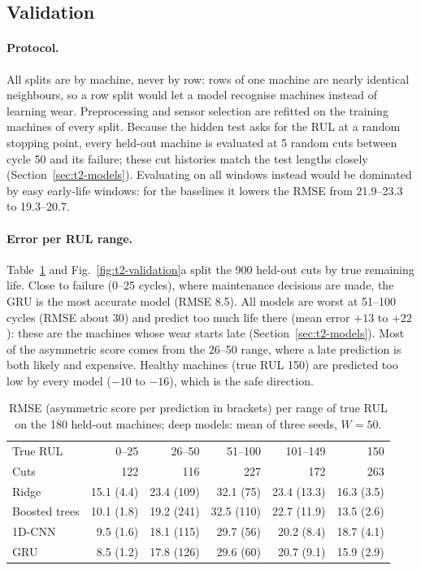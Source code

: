 \subsection{Validation}
\label{sec:t2-validation}

\paragraph{Protocol.} All splits are by machine, never by row: rows of one machine are nearly
identical neighbours, so a row split would let a model recognise machines instead of learning
wear. Preprocessing and sensor selection are refitted on the training machines of every split.
Because the hidden test asks for the RUL at a random stopping point, every held-out machine is
evaluated at 5 random cuts between cycle 50 and its failure; these cut histories match the test
lengths closely (Section~\ref{sec:t2-models}). Evaluating on all windows instead would be
dominated by easy early-life windows: for the baselines it lowers the RMSE from 21.9--23.3 to
19.3--20.7.

\paragraph{Error per RUL range.} Table~\ref{tab:t2-ranges} and Fig.~\ref{fig:t2-validation}a split
the 900 held-out cuts by true remaining life. Close to failure (0--25 cycles), where maintenance
decisions are made, the GRU is the most accurate model (RMSE 8.5). All models are worst at 51--100
cycles (RMSE about 30) and predict too much life there (mean error $+13$ to $+22$): these are the
machines whose wear starts late (Section~\ref{sec:t2-models}). Most of the asymmetric score comes
from the 26--50 range, where a late prediction is both likely and expensive. Healthy machines
(true RUL 150) are predicted too low by every model ($-10$ to $-16$), which is the safe direction.

\begin{table}[t]
  \centering
  \caption{RMSE (asymmetric score per prediction in brackets) per range of true RUL on the 180
  held-out machines; deep models: mean of three seeds, $W=50$.}
  \label{tab:t2-ranges}
  \small
  \begin{tabular}{lrrrrr}
    \toprule
    True RUL & 0--25 & 26--50 & 51--100 & 101--149 & 150 \\
    Cuts     & 122   & 116    & 227     & 172      & 263 \\
    \midrule
    Ridge         & 15.1 (4.4) & 23.4 (109) & 32.1 (75)  & 23.4 (13.3) & 16.3 (3.5) \\
    Boosted trees & 10.1 (1.8) & 19.2 (241) & 32.5 (110) & 22.7 (11.9) & 13.5 (2.6) \\
    1D-CNN        & 9.5 (1.6)  & 18.1 (115) & 29.7 (56)  & 20.2 (8.4)  & 18.7 (4.1) \\
    GRU           & 8.5 (1.2)  & 17.8 (126) & 29.6 (60)  & 20.7 (9.1)  & 15.9 (2.9) \\
    \bottomrule
  \end{tabular}
\end{table}

